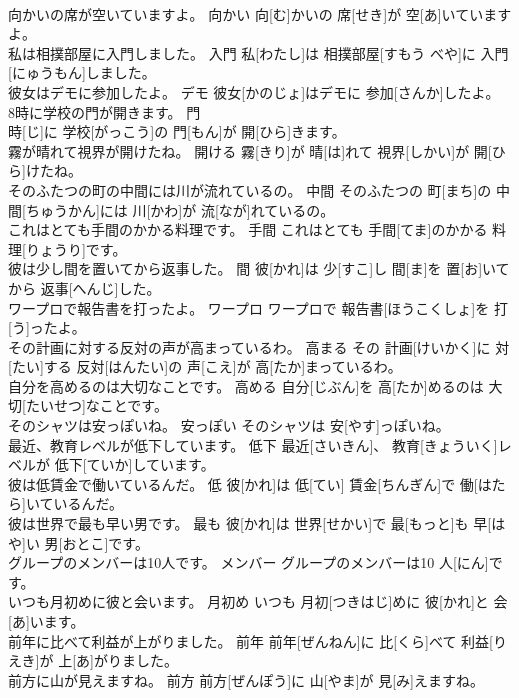 \documentclass[8pt]{extreport}
\begin{document}
\begin{CJK}{UTF8}{min}
\\	向かいの席が空いていますよ。	向かい	向[む]かいの 席[せき]が 空[あ]いていますよ。	
\\	私は相撲部屋に入門しました。	入門	私[わたし]は 相撲部屋[すもう べや]に 入門[にゅうもん]しました。	
\\	彼女はデモに参加したよ。	デモ	彼女[かのじょ]はデモに 参加[さんか]したよ。	
\\	8時に学校の門が開きます。	門	
\\	時[じ]に 学校[がっこう]の 門[もん]が 開[ひら]きます。	
\\	霧が晴れて視界が開けたね。	開ける	霧[きり]が 晴[は]れて 視界[しかい]が 開[ひら]けたね。	
\\	そのふたつの町の中間には川が流れているの。	中間	そのふたつの 町[まち]の 中間[ちゅうかん]には 川[かわ]が 流[なが]れているの。	
\\	これはとても手間のかかる料理です。	手間	これはとても 手間[てま]のかかる 料理[りょうり]です。	
\\	彼は少し間を置いてから返事した。	間	彼[かれ]は 少[すこ]し 間[ま]を 置[お]いてから 返事[へんじ]した。	
\\	ワープロで報告書を打ったよ。	ワープロ	ワープロで 報告書[ほうこくしょ]を 打[う]ったよ。	
\\	その計画に対する反対の声が高まっているわ。	高まる	その 計画[けいかく]に 対[たい]する 反対[はんたい]の 声[こえ]が 高[たか]まっているわ。	
\\	自分を高めるのは大切なことです。	高める	自分[じぶん]を 高[たか]めるのは 大切[たいせつ]なことです。	
\\	そのシャツは安っぽいね。	安っぽい	そのシャツは 安[やす]っぽいね。	
\\	最近、教育レベルが低下しています。	低下	最近[さいきん]、 教育[きょういく]レベルが 低下[ていか]しています。	
\\	彼は低賃金で働いているんだ。	低	彼[かれ]は 低[てい] 賃金[ちんぎん]で 働[はたら]いているんだ。	
\\	彼は世界で最も早い男です。	最も	彼[かれ]は 世界[せかい]で 最[もっと]も 早[はや]い 男[おとこ]です。	
\\	グループのメンバーは10人です。	メンバー	グループのメンバーは10 人[にん]です。	
\\	いつも月初めに彼と会います。	月初め	いつも 月初[つきはじ]めに 彼[かれ]と 会[あ]います。	
\\	前年に比べて利益が上がりました。	前年	前年[ぜんねん]に 比[くら]べて 利益[りえき]が 上[あ]がりました。	
\\	前方に山が見えますね。	前方	前方[ぜんぽう]に 山[やま]が 見[み]えますね。	

\end{CJK}
\end{document}
